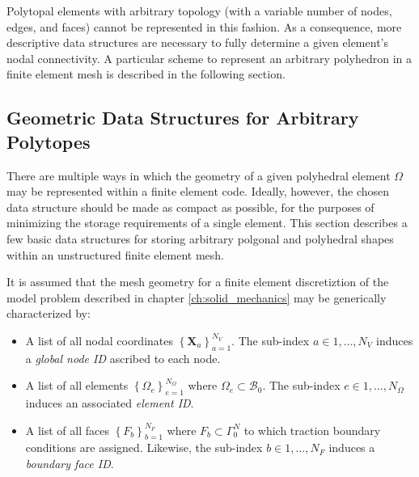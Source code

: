 	Polytopal elements with arbitrary topology (with a variable number of nodes, edges, and faces) cannot be represented in this fashion. As a consequence, more descriptive data structures are necessary to fully determine a given element's nodal connectivity. A particular scheme to represent an arbitrary polyhedron in a finite element mesh is described in the following section.

\subsection*{Geometric Data Structures for Arbitrary Polytopes}

	There are multiple ways in which the geometry of a given polyhedral element $\Omega$ may be represented within a finite element code. Ideally, however, the chosen data structure should be made as compact as possible, for the purposes of minimizing the storage requirements of a single element. This section describes a few basic data structures for storing arbitrary polgonal and polyhedral shapes within an unstructured finite element mesh.
	
	It is assumed that the mesh geometry for a finite element discretiztion of the model problem described in chapter \ref{ch:solid_mechanics} may be generically characterized by:
	\begin{itemize}
		\item A list of all nodal coordinates $\left\{ \mathbf{X}_a \right\}_{a=1}^{N_V}$. The sub-index $a \in 1, \ldots, N_V$ induces a \textit{global node ID} ascribed to each node.
		\item A list of all elements $\left\{ \Omega_{e} \right\}_{e = 1}^{N_\Omega}$ where $\Omega_{e} \subset \mathcal{B}_0$. The sub-index $e \in 1, \ldots, N_\Omega$ induces an associated \textit{element ID}.
		\item A list of all faces $\left\{ F_{b} \right\}_{b = 1}^{N_F}$ where $F_{b} \subset \Gamma^N_0$ to which traction boundary conditions are assigned. Likewise, the sub-index $b \in 1, \ldots, N_F$ induces a \textit{boundary face ID}.
	\end{itemize}
	
